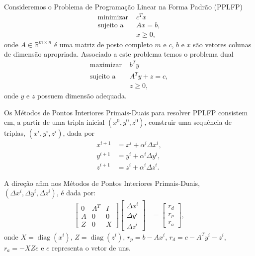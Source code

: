\documentclass[]{beamer}
\DeclareMathOperator*{\diag}{diag}
\begin{document}
\begin{frame}[t,fragile]
\begin{columns}[t]
\begin{column}{0.4\textwidth}
      Consideremos o Problema de Programação Linear na Forma Padrão (PPLFP)
      \begin{align*}
          \text{minimizar } & c^T x \\
          \text{sujeito a } & A x = b, \\
          & x \geq 0,
      \end{align*}
      onde $A \in \mathbb{R}^{m \times n}$ é uma matriz de posto completo $m$ e $c$,
      $b$ e $x$ são vetores colunas de dimensão apropriada. Associado a este problema
      temos o problema dual
      \begin{align*}
          \text{maximizar } & b^T y \\
          \text{sujeito a } & A^T y + z = c, \\
          & z \geq 0,
      \end{align*}
      onde $y$ e $z$ possuem dimensão adequada.

      Os Métodos de Pontos Interiores Primais-Duais para resolver PPLFP consistem em, a
      partir de uma tripla inicial $(x^0, y^0, z^0)$, construir uma
      sequência de triplas, $(x^i, y^i, z^i)$, dada por
      \begin{align*}
          x^{i + 1} &= x^i + \alpha^i \Delta x^i, \\
          y^{i + 1} &= y^i + \alpha^i \Delta y^i, \\
          z^{i + 1} &= z^i + \alpha^i \Delta z^i.
      \end{align*}

      A direção afim nos Métodos de Pontos Interiores Primais-Duais, $(\Delta x^i,
      \Delta y^i, \Delta z^i)$,  é dada por:
      \begin{align*}
          \begin{bmatrix}
               0 & A^T & I \\
               A & 0 & 0 \\
               Z & 0 & X
           \end{bmatrix} \begin{bmatrix}
               \Delta x^i \\
               \Delta y^i \\
               \Delta z^i
           \end{bmatrix} &= \begin{bmatrix}
               r_d \\
               r_p \\
               r_a
           \end{bmatrix},
      \end{align*}
      onde $X = \diag(x^i)$, $Z = \diag(z^i)$, $r_p = b - A x^i$, $r_d = c - A^T y^i
      - z^i$, $r_a = - X Z e$ e $e$ representa o vetor de uns.


\end{column}
\end{columns}
\end{frame}
\end{document}
